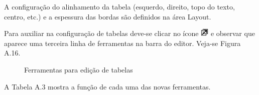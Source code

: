 A configuração do alinhamento da tabela (esquerdo, direito, topo do texto, centro, etc.) e a espessura das bordas são definidos na área Layout.

Para auxiliar na configuração de tabelas deve-se clicar no ícone \includegraphics[width=0.4cm]{imagem/cap0/fullscreen.jpg} e observar que aparece uma terceira linha de ferramentas na barra do editor. Veja-se Figura A.16.

\begin{figure}
 \begin{center}
  \caption{Ferramentas para edição de tabelas}
 \end{center}
\end{figure}

A Tabela A.3 mostra a função de cada uma das novas ferramentas.

